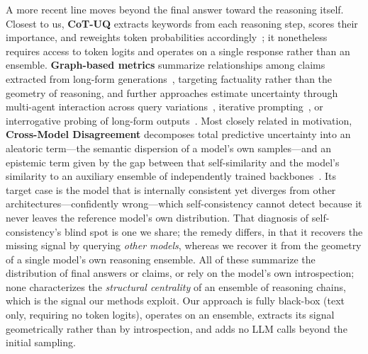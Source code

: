 \documentclass[letterpaper]{article} %
\begin{document}
A more recent line moves beyond the final answer toward the reasoning itself.
Closest to us, \textbf{CoT-UQ} extracts keywords from each reasoning step, scores their
importance, and reweights token probabilities accordingly~\citep{zhang2025cotuq};
it nonetheless requires access to token logits and operates on a single response
rather than an ensemble. \textbf{Graph-based metrics} summarize relationships among claims
extracted from long-form generations~\citep{jiang2024graphuncertainty}, targeting
factuality rather than the geometry of reasoning, and further approaches estimate
uncertainty through multi-agent interaction across query
variations~\citep{feng2025multiagent}, iterative
prompting~\citep{abbasiyadkori2024believe}, or interrogative probing of long-form
outputs~\citep{fan2026iuq}. Most closely related in motivation,
\textbf{Cross-Model Disagreement} decomposes total predictive uncertainty into an
aleatoric term---the semantic dispersion of a model's own samples---and an
epistemic term given by the gap between that self-similarity and the model's
similarity to an auxiliary ensemble of independently trained
backbones~\citep{hamidieh2026crossmodel}. Its target case is the model that is
internally consistent yet diverges from other architectures---confidently
wrong---which self-consistency cannot detect because it never leaves the reference
model's own distribution. That diagnosis of self-consistency's blind spot is one we
share; the remedy differs, in that it recovers the missing signal by querying
\emph{other models}, whereas we recover it from the geometry of a single model's
own reasoning ensemble. All of these summarize the distribution of final
answers or claims, or rely on the model's own introspection; none characterizes
the \emph{structural centrality} of an ensemble of reasoning chains, which is the
signal our methods exploit. Our approach is fully black-box (text only, requiring
no token logits), operates on an ensemble, extracts its signal geometrically
rather than by introspection, and adds no LLM calls beyond the initial sampling.
\end{document}
